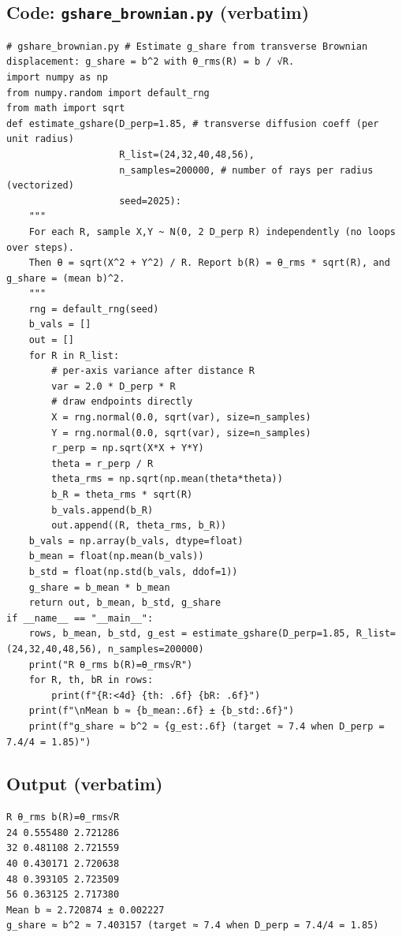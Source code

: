 \documentclass[11pt]{article}
\begin{document}
\subsection*{Code: \texttt{gshare\_brownian.py} (verbatim)}
\begin{verbatim}
# gshare_brownian.py # Estimate g_share from transverse Brownian displacement: g_share = b^2 with θ_rms(R) = b / √R.
import numpy as np
from numpy.random import default_rng
from math import sqrt
def estimate_gshare(D_perp=1.85, # transverse diffusion coeff (per unit radius)
                    R_list=(24,32,40,48,56),
                    n_samples=200000, # number of rays per radius (vectorized)
                    seed=2025):
    """
    For each R, sample X,Y ~ N(0, 2 D_perp R) independently (no loops over steps).
    Then θ = sqrt(X^2 + Y^2) / R. Report b(R) = θ_rms * sqrt(R), and g_share = (mean b)^2.
    """
    rng = default_rng(seed)
    b_vals = []
    out = []
    for R in R_list:
        # per-axis variance after distance R
        var = 2.0 * D_perp * R
        # draw endpoints directly
        X = rng.normal(0.0, sqrt(var), size=n_samples)
        Y = rng.normal(0.0, sqrt(var), size=n_samples)
        r_perp = np.sqrt(X*X + Y*Y)
        theta = r_perp / R
        theta_rms = np.sqrt(np.mean(theta*theta))
        b_R = theta_rms * sqrt(R)
        b_vals.append(b_R)
        out.append((R, theta_rms, b_R))
    b_vals = np.array(b_vals, dtype=float)
    b_mean = float(np.mean(b_vals))
    b_std = float(np.std(b_vals, ddof=1))
    g_share = b_mean * b_mean
    return out, b_mean, b_std, g_share
if __name__ == "__main__":
    rows, b_mean, b_std, g_est = estimate_gshare(D_perp=1.85, R_list=(24,32,40,48,56), n_samples=200000)
    print("R θ_rms b(R)=θ_rms√R")
    for R, th, bR in rows:
        print(f"{R:<4d} {th: .6f} {bR: .6f}")
    print(f"\nMean b ≈ {b_mean:.6f} ± {b_std:.6f}")
    print(f"g_share ≈ b^2 ≈ {g_est:.6f} (target ≈ 7.4 when D_perp = 7.4/4 = 1.85)")
\end{verbatim}

\subsection*{Output (verbatim)}
\begin{verbatim}
R θ_rms b(R)=θ_rms√R
24 0.555480 2.721286
32 0.481108 2.721559
40 0.430171 2.720638
48 0.393105 2.723509
56 0.363125 2.717380
Mean b ≈ 2.720874 ± 0.002227
g_share ≈ b^2 ≈ 7.403157 (target ≈ 7.4 when D_perp = 7.4/4 = 1.85)
\end{verbatim}
\end{document}
